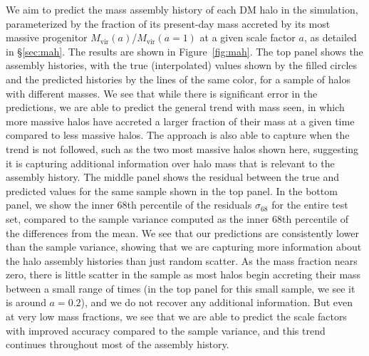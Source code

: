 We aim to predict the mass assembly history of each DM halo in the \dark simulation, parameterized by the fraction of its present-day mass accreted by its most massive progenitor $M_\mathrm{vir}(a)$/$M_\mathrm{vir}(a=1)$ at a given scale factor $a$, as detailed in \S\ref{sec:mah}.
The results are shown in Figure~\ref{fig:mah}.
The top panel shows the assembly histories, with the true (interpolated) values shown by the filled circles and the predicted histories by the lines of the same color, for a sample of halos with different masses.
We see that while there is significant error in the predictions, we are able to predict the general trend with mass seen, in which more massive halos have accreted a larger fraction of their mass at a given time compared to less massive halos.
The approach is also able to capture when the trend is not followed, such as the two most massive halos shown here, suggesting it is capturing additional information over halo mass that is relevant to the assembly history.
The middle panel shows the residual between the true and predicted values for the same sample shown in the top panel.
In the bottom panel, we show the inner 68th percentile of the residuals $\sigma_{68}$ for the entire test set, compared to the sample variance computed as the inner 68th percentile of the differences from the mean.
We see that our predictions are consistently lower than the sample variance, showing that we are capturing more information about the halo assembly histories than just random scatter.
As the mass fraction nears zero, there is little scatter in the sample as most halos begin accreting their mass between a small range of times (in the top panel for this small sample, we see it is around $a=0.2$), and we do not recover any additional information.
But even at very low mass fractions, we see that we are able to predict the scale factors with improved accuracy compared to the sample variance, and this trend continues throughout most of the assembly history.


